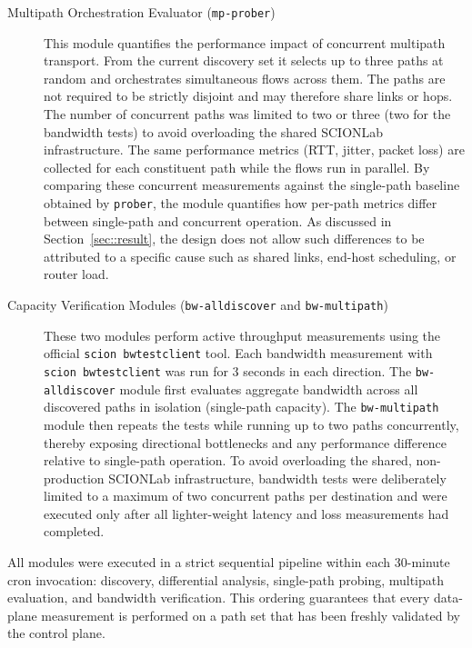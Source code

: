 \documentclass[pdflatex,sn-vancouver-num]{sn-jnl}%
\theoremstyle{thmstyleone}%
\theoremstyle{thmstyletwo}%
\theoremstyle{thmstylethree}%
\begin{document}
\begin{description}
        \item[Multipath Orchestration Evaluator (\texttt{mp-prober})] This module quantifies the performance impact of concurrent multipath transport. From the current discovery set it selects up to three paths at random and orchestrates simultaneous flows across them. The paths are not required to be strictly disjoint and may therefore share links or hops. The number of concurrent paths was limited to two or three (two for the bandwidth tests) to avoid overloading the shared SCIONLab infrastructure. The same performance metrics (RTT, jitter, packet loss) are collected for each constituent path while the flows run in parallel. By comparing these concurrent measurements against the single-path baseline obtained by \texttt{prober}, the module quantifies how per-path metrics differ between single-path and concurrent operation. As discussed in Section~\ref{sec::result}, the design does not allow such differences to be attributed to a specific cause such as shared links, end-host scheduling, or router load.\\

        \item[Capacity Verification Modules (\texttt{bw-alldiscover} and \texttt{bw-multipath})] These two modules perform active throughput measurements using the official \texttt{scion bwtestclient} tool. Each bandwidth measurement with \texttt{scion bwtestclient} was run for 3 seconds in each direction. The \texttt{bw-alldiscover} module first evaluates aggregate bandwidth across all discovered paths in isolation (single-path capacity). The \texttt{bw-multipath} module then repeats the tests while running up to two paths concurrently, thereby exposing directional bottlenecks and any performance difference relative to single-path operation. To avoid overloading the shared, non-production SCIONLab infrastructure, bandwidth tests were deliberately limited to a maximum of two concurrent paths per destination and were executed only after all lighter-weight latency and loss measurements had completed.\\
    \end{description}
    All modules were executed in a strict sequential pipeline within each 30-minute cron invocation: discovery, differential analysis, single-path probing, multipath evaluation, and bandwidth verification. This ordering guarantees that every data-plane measurement is performed on a path set that has been freshly validated by the control plane.
    
\end{document}
